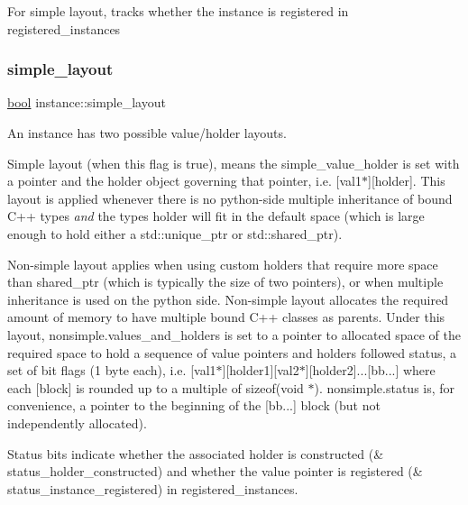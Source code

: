 For simple layout, tracks whether the instance is registered in {\ttfamily registered\+\_\+instances} 

\mbox{\label{structinstance_a1e23897fd281cdd5cecd2d36b5d7a26d}} 
\subsubsection{\texorpdfstring{simple\_layout}{simple\_layout}}
{\footnotesize\ttfamily \mbox{\hyperlink{asdl_8h_af6a258d8f3ee5206d682d799316314b1}{bool}} instance\+::simple\+\_\+layout}

An instance has two possible value/holder layouts.

Simple layout (when this flag is true), means the {\ttfamily simple\+\_\+value\+\_\+holder} is set with a pointer and the holder object governing that pointer, i.\+e. \mbox{[}val1$\ast$\mbox{]}\mbox{[}holder\mbox{]}. This layout is applied whenever there is no python-\/side multiple inheritance of bound C++ types {\itshape and} the type\textquotesingle{}s holder will fit in the default space (which is large enough to hold either a std\+::unique\+\_\+ptr or std\+::shared\+\_\+ptr).

Non-\/simple layout applies when using custom holders that require more space than {\ttfamily shared\+\_\+ptr} (which is typically the size of two pointers), or when multiple inheritance is used on the python side. Non-\/simple layout allocates the required amount of memory to have multiple bound C++ classes as parents. Under this layout, {\ttfamily nonsimple.\+values\+\_\+and\+\_\+holders} is set to a pointer to allocated space of the required space to hold a sequence of value pointers and holders followed {\ttfamily status}, a set of bit flags (1 byte each), i.\+e. \mbox{[}val1$\ast$\mbox{]}\mbox{[}holder1\mbox{]}\mbox{[}val2$\ast$\mbox{]}\mbox{[}holder2\mbox{]}...\mbox{[}bb...\mbox{]} where each \mbox{[}block\mbox{]} is rounded up to a multiple of {\ttfamily sizeof(void $\ast$)}. {\ttfamily nonsimple.\+status} is, for convenience, a pointer to the beginning of the \mbox{[}bb...\mbox{]} block (but not independently allocated).

Status bits indicate whether the associated holder is constructed (\& status\+\_\+holder\+\_\+constructed) and whether the value pointer is registered (\& status\+\_\+instance\+\_\+registered) in {\ttfamily registered\+\_\+instances}. \mbox{\label{structinstance_a41170a51b771a937d421d60d97d50e48}} 
